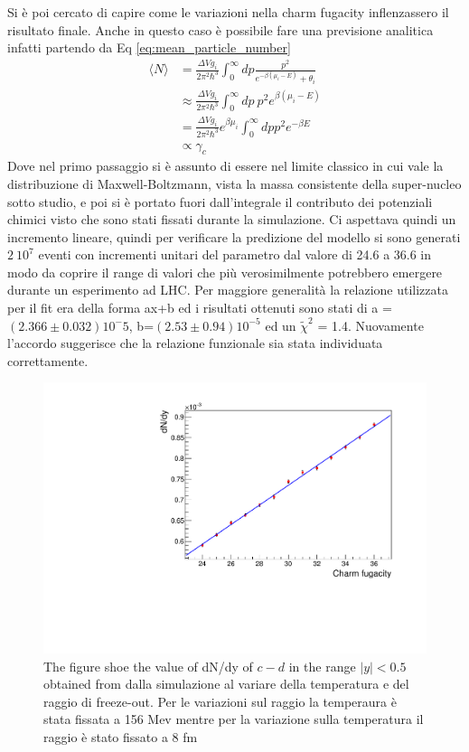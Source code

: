 \documentclass[12pt,a4paper]{book}
\begin{document}
	Si è poi cercato di capire come le variazioni nella charm fugacity inflenzassero il risultato finale. Anche in questo caso è possibile fare una previsione analitica infatti partendo da Eq \ref{eq:mean_particle_number}
\begin{equation}
	\begin{aligned}
		\langle N \rangle &= \frac{\Delta V g_i}{2\pi^2\hbar^3} 
		\int_{0}^{\infty} dp 
		\frac{p^2}{e^{-\beta(\mu_i-E)}+\theta_i} \\
		&\approx \frac{\Delta V g_i}{2\pi^2\hbar^3} 
		\int_{0}^{\infty} dp \ p^2 e^{\beta(\mu_i-E)} \\
		&= \frac{\Delta V g_i}{2\pi^2\hbar^3} e^{\beta \mu_i} 
		\int_{0}^{\infty} dp p^2 e^{-\beta E} \\
		&\propto \gamma_c
	\end{aligned}
	\label{eq:var_fug}
\end{equation}
 Dove nel primo passaggio si è assunto di essere nel limite classico in cui vale la distribuzione di Maxwell-Boltzmann, vista la massa consistente della super-nucleo sotto studio, e poi si è portato fuori dall'integrale il contributo dei potenziali chimici visto che sono stati fissati durante la simulazione. Ci aspettava quindi un incremento lineare, quindi per verificare la predizione del modello si sono generati $2 \ 10^7$ eventi con incrementi unitari del parametro dal valore di 24.6 a 36.6 in modo da coprire il range di valori che più verosimilmente potrebbero emergere durante un esperimento ad LHC. Per maggiore generalità la relazione utilizzata per il fit era della forma ax+b ed i risultati ottenuti sono stati di a = $(2.366 \pm 0.032)10^-5$, b=$(2.53 \pm 0.94) 10^{-5}$ ed un $\tilde{\chi}^2$ = 1.4. Nuovamente l'accordo suggerisce che la relazione funzionale sia stata individuata correttamente.	
		\begin{figure}
		\includegraphics[width=0.8 \linewidth]{pictures/var_fugacity.pdf}
		\caption{The figure shoe the value of dN/dy of $c-d$ in the range $|y|<0.5$ obtained from dalla simulazione al variare della temperatura e del raggio di freeze-out. Per le variazioni sul raggio la temperaura è stata fissata a 156 Mev mentre per la variazione sulla temperatura il raggio è stato fissato a 8 fm}
		\label{fig:var_fugacity}
	\end{figure}
	
\end{document}
